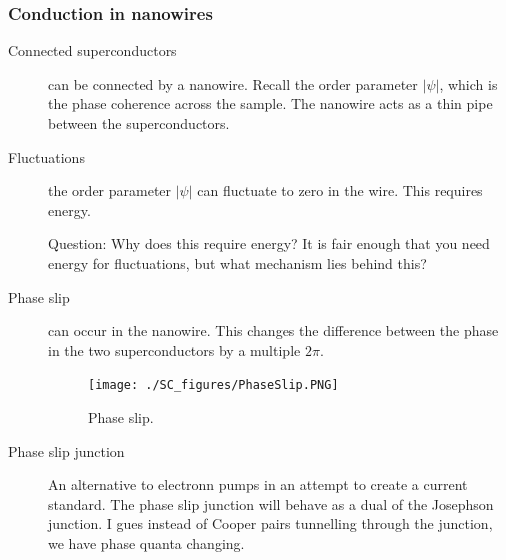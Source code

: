 \subsubsection{Conduction in nanowires}
\begin{description}
\item[Connected superconductors] can be connected by a nanowire. Recall the order parameter $|\psi|$, which is the phase coherence across the sample.  The nanowire acts as a thin pipe between the superconductors. 

\item[Fluctuations] the order parameter $|\psi|$ can fluctuate to zero in the wire. This requires energy. 

Question: Why does this require energy? It is fair enough that you need energy for fluctuations, but what mechanism lies behind this? 

\item[Phase slip] can occur in the nanowire. This changes the difference between the phase in the two superconductors by a multiple $2\pi$. 



\begin{figure}[h]
  \caption{Phase slip.}
  \centering
    \texttt{[image: ./SC\_figures/PhaseSlip.PNG]}
\end{figure}


\item[Phase slip junction] An alternative to electronn pumps in an attempt to create a current standard. The phase slip junction will behave as a dual of the Josephson junction. I gues instead of Cooper pairs tunnelling through the junction, we have phase quanta changing. 


\end{description}

